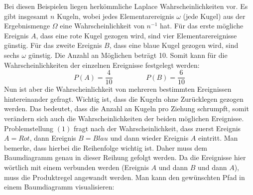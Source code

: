 Bei diesen Beispielen liegen herk\"{o}mmliche Laplace Wahrscheinlichkeiten vor. Es gibt insgesamt $n$ Kugeln, wobei jedes Elementarereignis $\omega$ (jede Kugel) aus der Ergebnismenge $\Omega$ eine Wahrscheinlichkeit von $n^{-1}$ hat. F\"{u}r das erste m\"{o}gliche Ereignis $A$, dass eine rote Kugel gezogen wird, sind vier Elementarereignisse g\"{u}nstig. F\"{u}r das zweite Ereignis $B$, dass eine blaue Kugel gezogen wird, sind sechs $\omega$ g\"{u}nstig. Die Anzahl an M\"{o}glichen betr\"{a}gt 10. Somit kann f\"{u}r die Wahrscheinlichkeiten der einzelnen Ereignisse festgelegt werden: $$P(A) = \frac{4}{10} \hspace{2cm} P(B) = \frac{6}{10}$$ Nun ist aber die Wahrscheinlichkeit von mehreren bestimmten Ereignissen hintereinander gefragt. Wichtig ist, dass die Kugeln ohne Zur\"{u}cklegen gezogen werden. Das bedeutet, dass die Anzahl an Kugeln pro Ziehung schrumpft, somit ver\"{a}ndern sich auch die Wahrscheinlichkeiten der beiden m\"{o}glichen Ereignisse. Problemstellung $(1)$ fragt nach der Wahrscheinlichkeit, dass zuerst Ereignis $A = Rot$, dann Ereignis $B = Blau$ und dann wieder Ereignis $A$ eintritt. Man bemerke, dass hierbei die Reihenfolge wichtig ist. Daher muss dem Baumdiagramm genau in dieser Reihung gefolgt werden. Da die Ereignisse hier w\"{o}rtlich mit einem  verbunden werden (Ereignis $A$ und dann $B$ und dann $A$), muss die Produktregel angewandt werden. Man kann den gew\"{u}nschten Pfad in einem Baumdiagramm visualisieren:

